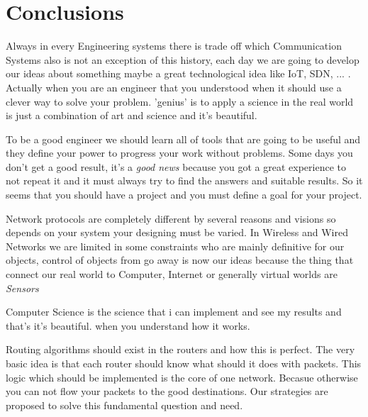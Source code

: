 
\chapter{Conclusions} %

\label{Conclusion} %



Always in every Engineering systems there is trade off which Communication Systems also is not an exception of this history, each day we are going to develop our ideas about something maybe a great technological idea like IoT, SDN, ... . Actually when you are an engineer that you understood when it should use a clever way to solve your problem. 'genius' is to apply a science in the real world is just a combination of art and science and it's beautiful.

To be a good engineer we should learn all of tools that are going to be useful and they define your power to progress your work without problems. Some days you don't get a good result, it's a \textit{good news }because you got a great experience to not repeat it and it must always try to find the answers and suitable results. So it seems that you should have a project and you must define a goal for your project.

Network protocols are completely different by several reasons and visions so depends on your system your designing must be varied. In Wireless and Wired Networks we are limited in some constraints who are mainly definitive for our objects, control of objects from go away is now our ideas because the thing that connect our real world to Computer, Internet or generally virtual worlds are \textit{Sensors}

Computer Science is the science that i can implement and see my results and that's it's beautiful. when you understand how it works.


Routing algorithms should exist in the routers and how this is perfect. The very basic idea is that each router should know what should it does with packets. This logic which should be implemented is the core of one network. Becasue otherwise you can not flow your packets to the good destinations. Our strategies are proposed to solve this fundamental question and need.
     




